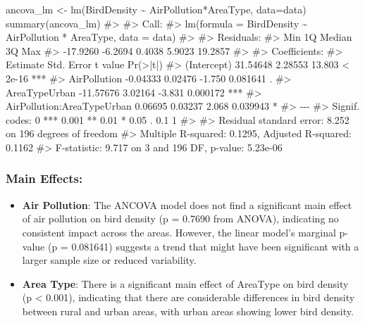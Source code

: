 \documentclass[
  letterpaper,
  DIV=11,
  numbers=noendperiod]{scrreprt}
\newenvironment{Shaded}{\begin{snugshade}}{\end{snugshade}}
\newcommand{\AttributeTok}[1]{\textcolor[rgb]{0.40,0.45,0.13}{#1}}
\newcommand{\CommentTok}[1]{\textcolor[rgb]{0.37,0.37,0.37}{#1}}
\newcommand{\FunctionTok}[1]{\textcolor[rgb]{0.28,0.35,0.67}{#1}}
\newcommand{\NormalTok}[1]{\textcolor[rgb]{0.00,0.23,0.31}{#1}}
\newcommand{\OtherTok}[1]{\textcolor[rgb]{0.00,0.23,0.31}{#1}}
\newcommand{\SpecialCharTok}[1]{\textcolor[rgb]{0.37,0.37,0.37}{#1}}
\begin{document}
\begin{Shaded}
\begin{Highlighting}[]
\NormalTok{ancova\_lm }\OtherTok{\textless{}{-}} \FunctionTok{lm}\NormalTok{(BirdDensity }\SpecialCharTok{\textasciitilde{}}\NormalTok{ AirPollution}\SpecialCharTok{*}\NormalTok{AreaType, }\AttributeTok{data=}\NormalTok{data)}
\FunctionTok{summary}\NormalTok{(ancova\_lm)}
\CommentTok{\#\textgreater{} }
\CommentTok{\#\textgreater{} Call:}
\CommentTok{\#\textgreater{} lm(formula = BirdDensity \textasciitilde{} AirPollution * AreaType, data = data)}
\CommentTok{\#\textgreater{} }
\CommentTok{\#\textgreater{} Residuals:}
\CommentTok{\#\textgreater{}      Min       1Q   Median       3Q      Max }
\CommentTok{\#\textgreater{} {-}17.9260  {-}6.2694   0.4038   5.9023  19.2857 }
\CommentTok{\#\textgreater{} }
\CommentTok{\#\textgreater{} Coefficients:}
\CommentTok{\#\textgreater{}                             Estimate Std. Error t value Pr(\textgreater{}|t|)    }
\CommentTok{\#\textgreater{} (Intercept)                 31.54648    2.28553  13.803  \textless{} 2e{-}16 ***}
\CommentTok{\#\textgreater{} AirPollution                {-}0.04333    0.02476  {-}1.750 0.081641 .  }
\CommentTok{\#\textgreater{} AreaTypeUrban              {-}11.57676    3.02164  {-}3.831 0.000172 ***}
\CommentTok{\#\textgreater{} AirPollution:AreaTypeUrban   0.06695    0.03237   2.068 0.039943 *  }
\CommentTok{\#\textgreater{} {-}{-}{-}}
\CommentTok{\#\textgreater{} Signif. codes:  0 \textquotesingle{}***\textquotesingle{} 0.001 \textquotesingle{}**\textquotesingle{} 0.01 \textquotesingle{}*\textquotesingle{} 0.05 \textquotesingle{}.\textquotesingle{} 0.1 \textquotesingle{} \textquotesingle{} 1}
\CommentTok{\#\textgreater{} }
\CommentTok{\#\textgreater{} Residual standard error: 8.252 on 196 degrees of freedom}
\CommentTok{\#\textgreater{} Multiple R{-}squared:  0.1295, Adjusted R{-}squared:  0.1162 }
\CommentTok{\#\textgreater{} F{-}statistic: 9.717 on 3 and 196 DF,  p{-}value: 5.23e{-}06}
\end{Highlighting}
\end{Shaded}

\subsubsection{Main Effects:}\label{main-effects-1}

\begin{itemize}
\item
  \textbf{Air Pollution}: The ANCOVA model does not find a significant
  main effect of air pollution on bird density (p = 0.7690 from ANOVA),
  indicating no consistent impact across the areas. However, the linear
  model's marginal p-value (p = 0.081641) suggests a trend that might
  have been significant with a larger sample size or reduced
  variability.
\item
  \textbf{Area Type}: There is a significant main effect of AreaType on
  bird density (p \textless{} 0.001), indicating that there are
  considerable differences in bird density between rural and urban
  areas, with urban areas showing lower bird density.
\end{itemize}
\end{document}
